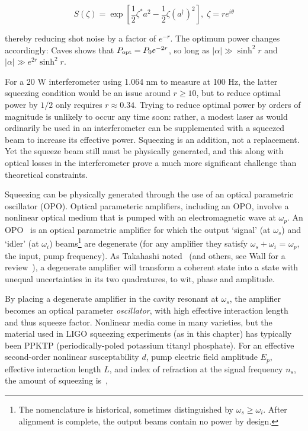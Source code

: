 \begin{equation}
S(\zeta)=\exp[\frac{1}{2}\zeta^{*}a^{2}-\frac{1}{2}\zeta(a^{\dagger})^{2}],\;\zeta=re^{i\theta}
\label{squeeze_operator_caves}
\end{equation}

\noindent thereby reducing shot noise by a factor of $e^{-r}$. The optimum power changes accordingly: Caves shows that $P_\textup{opt} = P_0 e^{-2r}$, so long as $|\alpha|\gg\sinh^2r$ and $|\alpha|\gg e^{2r}\sinh^2 r$. 

For a 20 W interferometer using 1.064 nm to measure at 100 Hz, the latter squeezing condition would be an issue around $r\geq10$, but to reduce optimal power by $1/2$ only requires $r \approx 0.34$. 
Trying to reduce optimal power by orders of magnitude is unlikely to occur any time soon: rather, a modest laser as would ordinarily be used in an interferometer can be supplemented with a squeezed beam to increase its effective power. 
Squeezing is an addition, not a replacement.
Yet the squeeze beam still must be physically generated, and this along with optical losses in the interferometer prove a much more significant challenge than theoretical constraints.

Squeezing can be physically generated through the use of an optical parametric oscillator (OPO).
Optical parameteric amplifiers, including an OPO, involve a nonlinear optical medium that is pumped with an electromagnetic wave at $\omega_p$.
An OPO~\cite{Caves1981} is an optical parametric amplifier for which the output `signal' (at $\omega_s$) and `idler' (at $\omega_i$) beams\footnote{The nomenclature is historical, sometimes distinguished by $\omega_s\geq\omega_i$. After alignment is complete, the output beams contain no power by design.} are degenerate (for any amplifier they satisfy $\omega_s + \omega_i$ = $\omega_p$, the input, pump frequency).
As Takahashi noted~\cite{Takahashi1965} (and others, see Wall for a review~\cite{Walls1983}), a degenerate amplifier will transform a coherent state into a state with unequal uncertainties in its two quadratures, to wit, phase and amplitude.

By placing a degenerate amplifier in the cavity resonant at $\omega_s$, the amplifier becomes an optical parameter \textit{oscillator}, with high effective interaction length and thus squeeze factor.
Nonlinear media come in many varieties, but the material used in LIGO squeezing experiments (as in this chapter) has typically been PPKTP (periodically-poled potassium titanyl phosphate).
For an effective second-order nonlinear susceptability $d$, pump electric field amplitude $E_p$, effective interaction length $L$, and index of refraction at the signal frequency $n_s$, the amount of squeezing is~\cite{Caves1981},

